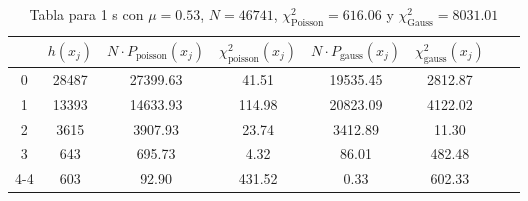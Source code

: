 \begin{center}
\begin{table}[H]
\caption{Tabla para 1 s con $\mu=0.53$, $N=46741$, $\chi^2_{\text{Poisson}}=616.06$  y $\chi^2_{\text{Gauss}}=8031.01$}
\label{Tab:histo_m_1s}
\begin{tabular}{cccccccc}
\toprule
 & $h(x_j)$ & $N \cdot P_{\text{poisson}} (x_j)$ & $\chi^2_{\text{poisson}}(x_j)$ & $N \cdot P_{\text{gauss}} (x_j)$ & $\chi^2_{\text{gauss}}(x_j)$ \\
\midrule
0 & \num{28487} & \num{27399.63} & \num{41.51} & \num{19535.45} & \num{2812.87} \\
1 & \num{13393} & \num{14633.93} & \num{114.98} & \num{20823.09} & \num{4122.02} \\
2 & \num{ 3615} & \num{3907.93} & \num{23.74} & \num{3412.89} & \num{11.30} \\
3 & \num{  643} & \num{695.73} & \num{4.32} & \num{86.01} & \num{482.48} \\
4-4 & \num{  603} & \num{92.90} & \num{431.52} & \num{0.33} & \num{602.33} \\
\bottomrule
\end{tabular}
\end{table}
\end{center}
